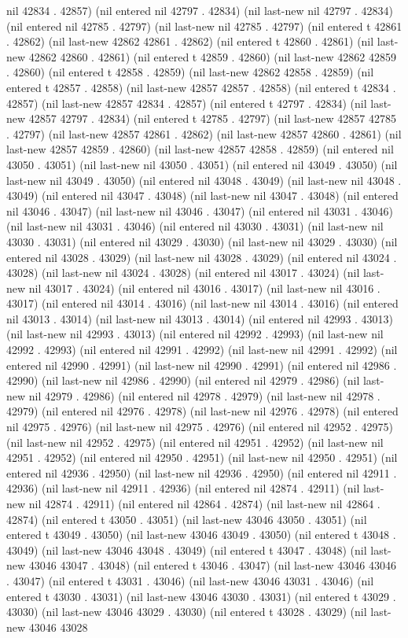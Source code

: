 nil 42834 . 42857) (nil entered nil 42797 . 42834) (nil last-new nil 42797 . 42834) (nil entered nil 42785 . 42797) (nil last-new nil 42785 . 42797) (nil entered t 42861 . 42862) (nil last-new 42862 42861 . 42862) (nil entered t 42860 . 42861) (nil last-new 42862 42860 . 42861) (nil entered t 42859 . 42860) (nil last-new 42862 42859 . 42860) (nil entered t 42858 . 42859) (nil last-new 42862 42858 . 42859) (nil entered t 42857 . 42858) (nil last-new 42857 42857 . 42858) (nil entered t 42834 . 42857) (nil last-new 42857 42834 . 42857) (nil entered t 42797 . 42834) (nil last-new 42857 42797 . 42834) (nil entered t 42785 . 42797) (nil last-new 42857 42785 . 42797) (nil last-new 42857 42861 . 42862) (nil last-new 42857 42860 . 42861) (nil last-new 42857 42859 . 42860) (nil last-new 42857 42858 . 42859) (nil entered nil 43050 . 43051) (nil last-new nil 43050 . 43051) (nil entered nil 43049 . 43050) (nil last-new nil 43049 . 43050) (nil entered nil 43048 . 43049) (nil last-new nil 43048 . 43049) (nil entered nil 43047 . 43048) (nil last-new nil 43047 . 43048) (nil entered nil 43046 . 43047) (nil last-new nil 43046 . 43047) (nil entered nil 43031 . 43046) (nil last-new nil 43031 . 43046) (nil entered nil 43030 . 43031) (nil last-new nil 43030 . 43031) (nil entered nil 43029 . 43030) (nil last-new nil 43029 . 43030) (nil entered nil 43028 . 43029) (nil last-new nil 43028 . 43029) (nil entered nil 43024 . 43028) (nil last-new nil 43024 . 43028) (nil entered nil 43017 . 43024) (nil last-new nil 43017 . 43024) (nil entered nil 43016 . 43017) (nil last-new nil 43016 . 43017) (nil entered nil 43014 . 43016) (nil last-new nil 43014 . 43016) (nil entered nil 43013 . 43014) (nil last-new nil 43013 . 43014) (nil entered nil 42993 . 43013) (nil last-new nil 42993 . 43013) (nil entered nil 42992 . 42993) (nil last-new nil 42992 . 42993) (nil entered nil 42991 . 42992) (nil last-new nil 42991 . 42992) (nil entered nil 42990 . 42991) (nil last-new nil 42990 . 42991) (nil entered nil 42986 . 42990) (nil last-new nil 42986 . 42990) (nil entered nil 42979 . 42986) (nil last-new nil 42979 . 42986) (nil entered nil 42978 . 42979) (nil last-new nil 42978 . 42979) (nil entered nil 42976 . 42978) (nil last-new nil 42976 . 42978) (nil entered nil 42975 . 42976) (nil last-new nil 42975 . 42976) (nil entered nil 42952 . 42975) (nil last-new nil 42952 . 42975) (nil entered nil 42951 . 42952) (nil last-new nil 42951 . 42952) (nil entered nil 42950 . 42951) (nil last-new nil 42950 . 42951) (nil entered nil 42936 . 42950) (nil last-new nil 42936 . 42950) (nil entered nil 42911 . 42936) (nil last-new nil 42911 . 42936) (nil entered nil 42874 . 42911) (nil last-new nil 42874 . 42911) (nil entered nil 42864 . 42874) (nil last-new nil 42864 . 42874) (nil entered t 43050 . 43051) (nil last-new 43046 43050 . 43051) (nil entered t 43049 . 43050) (nil last-new 43046 43049 . 43050) (nil entered t 43048 . 43049) (nil last-new 43046 43048 . 43049) (nil entered t 43047 . 43048) (nil last-new 43046 43047 . 43048) (nil entered t 43046 . 43047) (nil last-new 43046 43046 . 43047) (nil entered t 43031 . 43046) (nil last-new 43046 43031 . 43046) (nil entered t 43030 . 43031) (nil last-new 43046 43030 . 43031) (nil entered t 43029 . 43030) (nil last-new 43046 43029 . 43030) (nil entered t 43028 . 43029) (nil last-new 43046 43028 
